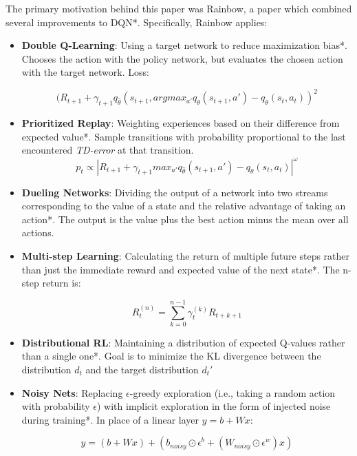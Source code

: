 \documentclass[letterpaper]{article}
\begin{document}
	The primary motivation behind this paper was Rainbow, a paper which combined several improvements to DQN*. Specifically, Rainbow applies:
	\begin{itemize}
		\item \textbf{Double Q-Learning}: Using a target network to reduce maximization bias*. Chooses the action with the policy network, but evaluates the chosen action with the target network. Loss:
		
		\begin{equation}
			(R_{t+1}+\gamma_{t+1}q_{\widehat{\theta}}(s_{t+1}, argmax_{a'}q_{\theta}(s_{t+1}, a')-q_{\theta}(s_t, a_t))^2
		\end{equation}
	
		\item \textbf{Prioritized Replay}: Weighting experiences based on their difference from expected value*. Sample transitions with probability proportional to the last encountered \textit{TD-error} at that transition.
		\begin{equation}
			p_t \propto |R_{t+1} + \gamma_{t+1}max_{a'}q_{\widehat{\theta}}(s_{t+1}, a')-q_{\theta}(s_t, a_t)|^\omega
		\end{equation}
		\item \textbf{Dueling Networks}: Dividing the output of a network into two streams corresponding to the value of a state and the relative advantage of taking an action*. The output is the value plus the best action minus the mean over all actions.
		
		\item \textbf{Multi-step Learning}: Calculating the return of multiple future steps rather than just the immediate reward and expected value of the next state*. The n-step return is:
		
		\begin{equation}
			R_t^{(n)}=\sum_{k=0}^{n-1}\gamma_t^{(k)}R_{t+k+1}
		\end{equation}
		
		
		\item \textbf{Distributional RL}: Maintaining a distribution of expected Q-values rather than a single one*. Goal is to minimize the  KL divergence between the distribution $d_t$ and the target distribution $d_t'$
		
		\item \textbf{Noisy Nets}: Replacing $\epsilon$-greedy exploration (i.e., taking a random action with probability $\epsilon$) with implicit exploration in the form of injected noise during training*. In place of a linear layer $y=b + Wx$: 
		
		\begin{equation}
			y = (b+Wx)+(b_{noisy} \odot \epsilon^b + (W_{noisy}\odot \epsilon^w)x)
		\end{equation}
	\end{itemize}
\end{document}
